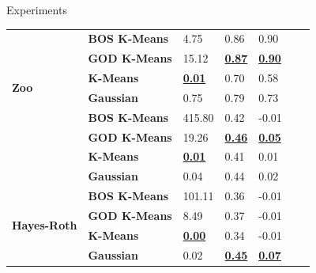 \documentclass{beamer}
\begin{document}
\begin{frame}{Experiments}
\begin{table}
\begin{adjustbox}{width=.7\columnwidth}
\begin{tabular}{lllllll}
                \multirow[t]{6}{*}{\textbf{Zoo}}            & \textbf{BOS K-Means} & 4.75                      & 0.86                      & 0.90                      \\
                \textbf{}                                   & \textbf{GOD K-Means} & 15.12                     & \textbf{\underline{0.87}} & \textbf{\underline{0.90}} \\
                \textbf{}                                   & \textbf{K-Means}     & \textbf{\underline{0.01}} & 0.70                      & 0.58                      \\
                \textbf{}                                   & \textbf{Gaussian}    & 0.75                      & 0.79                      & 0.73                      \\
                \cline{1-5}
                \multirow[t]{6}{*}{\textbf{Car Evaluation}} & \textbf{BOS K-Means} & 415.80                    & 0.42                      & -0.01                     \\
                \textbf{}                                   & \textbf{GOD K-Means} & 19.26                     & \textbf{\underline{0.46}} & \textbf{\underline{0.05}} \\
                \textbf{}                                   & \textbf{K-Means}     & \textbf{\underline{0.01}} & 0.41                      & 0.01                      \\
                \textbf{}                                   & \textbf{Gaussian}    & 0.04                      & 0.44                      & 0.02                      \\
                \cline{1-5}
                \multirow[t]{6}{*}{\textbf{Hayes-Roth}}     & \textbf{BOS K-Means} & 101.11                    & 0.36                      & -0.01                     \\
                \textbf{}                                   & \textbf{GOD K-Means} & 8.49                      & 0.37                      & -0.01                     \\
                \textbf{}                                   & \textbf{K-Means}     & \textbf{\underline{0.00}} & 0.34                      & -0.01                     \\
                \textbf{}                                   & \textbf{Gaussian}    & 0.02                      & \textbf{\underline{0.45}} & \textbf{\underline{0.07}} \\
                \cline{1-5}

\end{tabular}
\end{adjustbox}
\end{table}
\end{frame}
\end{document}
